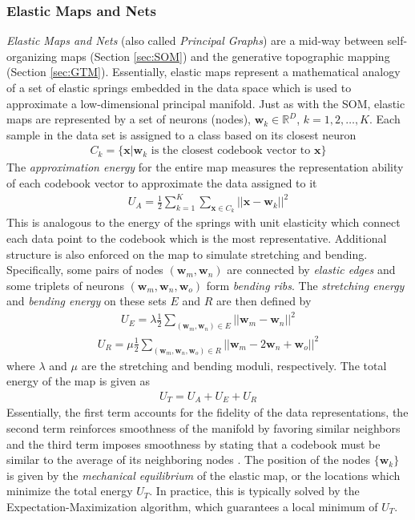 \subsubsection{Elastic Maps and Nets} \label{sec:Elastic_Maps}
\textit{Elastic Maps and Nets} \citep{Gorban2007ElasticMaps} (also called \textit{Principal Graphs}) are a mid-way between self-organizing maps (Section \ref{sec:SOM}) and the generative topographic mapping (Section \ref{sec:GTM}).   Essentially, elastic maps represent a mathematical analogy of a set of elastic springs embedded in the data space which is used to approximate a low-dimensional principal manifold.  Just as with the SOM, elastic maps are represented by a set of neurons (nodes), $\bm{w}_{k} \in \mathbb{R}^{D}$, $k=1,2,\dots,K$.  Each sample in the data set is assigned to a class based on its closest neuron 
\begin{align}
	C_{k} = \{\bm{x}|\bm{w}_{k} \text{ is the closest codebook vector to } \bm{x} \}
\end{align}
\noindent
The \textit{approximation energy} for the entire map measures the representation ability of each codebook vector to approximate the data assigned to it
\begin{align}
	U_{A} = \frac{1}{2}\sum_{k=1}^{K}\sum_{\bm{x}\in C_{k}} ||\bm{x} - \bm{w}_{k} ||^{2}
\end{align}
\noindent
This is analogous to the energy of the springs with unit elasticity which connect each data point to the codebook which is the most representative.  Additional structure is also enforced on the map to simulate stretching and bending.  Specifically, some pairs of nodes $(\bm{w}_{m}, \bm{w}_{n})$ are connected by \textit{elastic edges} and some triplets of neurons $(\bm{w}_{m}, \bm{w}_{n}, \bm{w}_{o})$ form \textit{bending ribs}.  The \textit{stretching energy} and \textit{bending energy} on these sets $E$ and $R$ are then defined by
\begin{align}
	U_{E} = \lambda \frac{1}{2} \sum_{(\bm{w}_{m}, \bm{w}_{n}) \in E} ||\bm{w}_{m} - \bm{w}_{n} ||^{2}
\end{align}
\begin{align}
	U_{R} = \mu \frac{1}{2} \sum_{(\bm{w}_{m}, \bm{w}_{n}, \bm{w}_{o}) \in R} ||\bm{w}_{m} - 2\bm{w}_{n} + \bm{w}_{o}||^{2}
\end{align}
\noindent
where $\lambda$ and $\mu$ are the stretching and bending moduli, respectively.  The total energy of the map is given as
\begin{align}
	U_{T} = U_{A} + U_{E} + U_{R}
\end{align}
\noindent
Essentially, the first term accounts for the fidelity of the data representations, the second term reinforces smoothness of the manifold by favoring similar neighbors and the third term imposes smoothness by stating that a codebook must be similar to the average of its neighboring nodes \citep{Sorzano2014DRReview}.  The position of the nodes $\{\bm{w}_{k}\}$ is given by the \textit{mechanical equilibrium} of the elastic map, or the locations which minimize the total energy $U_{T}$.  In practice, this is typically solved by the Expectation-Maximization algorithm, which guarantees a local minimum of $U_{T}$.

